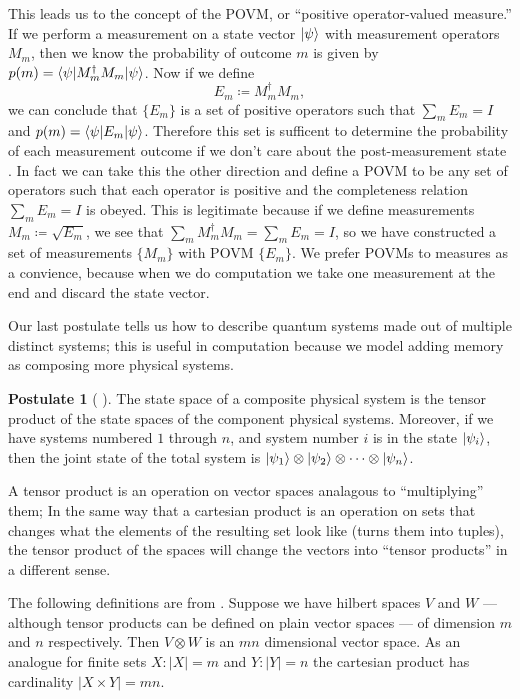 \documentclass[12pt,twoside]{reedthesis}
\theoremstyle{plain}   %
\theoremstyle{definition}
\newtheorem{post}{Postulate}[section]
\theoremstyle{remark}
\numberwithin{equation}{section}
\begin{document}
  This leads us to the concept of the POVM, or ``positive operator-valued measure.''
  If we perform a measurement on a state vector $\ket{\psi}$ with measurement operators $M_m$, then we know the probability of outcome $m$ is given by $p(m) = \braket{\psi | M_m^\dag M_m | \psi}$.
  Now if we define
  \[ E_m \coloneq M_m^\dag M_m,\]
  we can conclude that $\{E_m\}$ is a set of positive operators such that $\sum_m E_m = I$ and $p(m) = \braket{\psi | E_m | \psi}$.
  Therefore this set is sufficent to determine the probability of each measurement outcome if we don't care about the post-measurement state \cite[2.2.6]{nielsen2010}.
  In fact we can take this the other direction and define a POVM to be any set of operators such that each operator is positive and the
  completeness relation $\sum_m E_m = I$ is obeyed.
  This is legitimate because if we define measurements $M_m \coloneq \sqrt{E_m}$, we see that $\sum_m M_m^\dag M_m = \sum_m E_m = I$,
  so we have constructed a set of measurements $\{M_m\}$ with POVM $\{E_m\}$.
  We prefer POVMs to measures as a convience, because when we do computation we take one measurement at the end and discard the state vector. \par
  Our last postulate tells us how to describe quantum systems made out of multiple distinct systems; this is useful in computation because we model adding memory as
  composing more physical systems.
  \begin{post}[{ \cite[2.2.8]{nielsen2010} }] 
    The state space of a composite physical system is the tensor product of the state spaces of the component physical systems. Moreover,
    if we have systems numbered $1$ through $n$, and system number $i$ is in the state $\ket{\psi_i }$, then the joint state of the total system is $\ket{\psi_1} \otimes \ket{\psi_2} \otimes \cdots \otimes \ket{\psi_n}$.
  \end{post}
  A tensor product is an operation on vector spaces analagous to ``multiplying'' them;
  In the same way that a cartesian product is an operation on sets that changes what the elements of the resulting set look like (turns them into tuples),
  the tensor product of the spaces will change the vectors into ``tensor products'' in a different sense.
  \par
  The following definitions are from \cite[2.1.7]{nielsen2010}.
  Suppose we have hilbert spaces $V$ and $W$ --- although tensor products can be defined on plain vector spaces --- of dimension $m$ and $n$ respectively.
  Then $V \otimes W$ is an $mn$ dimensional vector space.
  As an analogue for finite sets $X: |X| = m$ and $Y: |Y| = n$ the cartesian product has cardinality $|X \times Y| = mn$.
\end{document}
